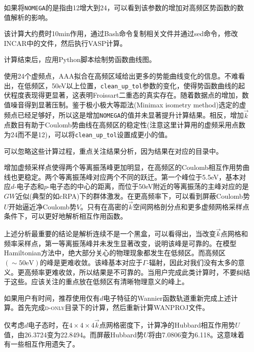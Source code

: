 如果将\texttt{NOMEGA}的是指由12增大到24，可以看到该参数的增加对高频区势函数的数值解析的影响。%

该计算大约费时\textrm{10min}作用，通过\textrm{Bash}命令复制相关文件并通过\textrm{sed}命令，修改\textrm{INCAR}中的文件，然后执行\textrm{VASP}计算。

计算结束后，应用\textrm{Python}脚本绘制势函数曲线图。

使用24个虚频点，\textrm{AAA}拟合在高频区域给出更多的势能曲线变化的信息。不难看出，在低频区，\textrm{50eV}以上位置，\texttt{clean\_up\_tol}参数的变化，使得势函数曲线的起伏程度表现得更显著，这表明\textrm{Froissart}二重态的真实存在。随着数据点的增加，数值噪音得到显著压制。鉴于极小极大等距法\textrm{(Minimax isometry method)}选定的虚频点已经足够好，所以这是增加\texttt{NOMEGA}的值并未显著提升计算结果。相反，增加$\vec k$点数目有助于\textrm{Coulomb}势曲线在高频区的稳定性(注意这里计算用的虚频采用点数为24而不是12)，可以将\texttt{clean\_up\_tol}设置成更小的值。%

可以忽略这些计算过程，重点关注结果分析，因为结果在对应的目录中。

增加虚频采样点使得两个等离振荡峰更加明显，在高频区的\textrm{Coulomb}相互作用势曲线也更稳定。两个等离振荡峰对应两个不同的跃迁。第一个峰位于\textrm{5.5eV}，基本对应$d$-电子态和$p$-电子态的中心的距离，而位于\textrm{50eV}附近的等离振荡的主峰对应的是$GW$近似(典型的如\textrm{cRPA})下的群体激发。在更高频率下，可以看到屏蔽\textrm{Coulomb}势$U$开始逼近净\textrm{Coulomb}势$V$。只有在高密的$\vec k$空间网格剖分点和更多虚频网格采样点条件下，可以更好地解析相互作用函数。

上述分析最重要的结论是解析连续不是一个黑盒，可以看得出，当改变$\vec k$点网格和频率采样点，第一等离振荡峰并未发生显著改变，说明该峰是可靠的。在模型\textrm{Hamiltonian}方法中，绝大部分关心的物理现象都发生在低频区。而高频区$(\sim50\mathrm{eV})$的峰是更难收敛。该峰基本对应于$\Gamma$-辐射，因此对我们没有太多的意义。更高频率更难收敛，所以结果是不可靠的。当用户完成此类计算时，不要纠结于这些。应该关注的重点放在低频区有清晰物理意义的峰上。

如果用户有时间，推荐使用仅有$d$电子特征的\textrm{Wannier}函数轨道重新完成上述计算。首先完成\textsc{d-only}目录下的计算，然后重新计算\textrm{WANPROJ}文件。

仅考虑$d$电子态时，在$4\times4\times4$$\vec k$点网格密度下，计算净的\textrm{Hubbard}相互作用势$U$值，由26.3724变为22.8494。而屏蔽\textrm{Hubbard}势$U$将由7.0806变为6.118。这意味着有一些相互作用遗失了。
